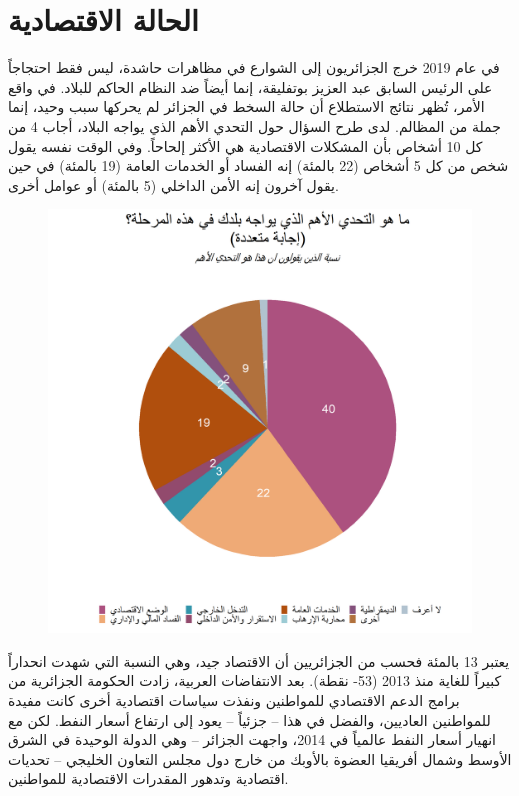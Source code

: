 \documentclass{article}
\begin{document}
\section*{الحالة الاقتصادية}

 في عام 2019 خرج الجزائريون إلى الشوارع في مظاهرات حاشدة، ليس فقط احتجاجاً على الرئيس السابق عبد العزيز بوتفليقة، إنما أيضاً ضد النظام الحاكم للبلاد. في واقع الأمر، تُظهر نتائج الاستطلاع أن حالة السخط في الجزائر لم يحركها سبب وحيد، إنما جملة من المظالم. لدى طرح السؤال حول التحدي الأهم الذي يواجه البلاد، أجاب 4 من كل 10 أشخاص بأن المشكلات الاقتصادية هي الأكثر إلحاحاً. وفي الوقت نفسه يقول شخص من كل 5 أشخاص (22 بالمئة) إنه الفساد أو الخدمات العامة (19 بالمئة) في حين يقول آخرون إنه الأمن الداخلي (5 بالمئة) أو عوامل أخرى. 
	
	\begin{center}
	\begin{figure}[H]
		\centering
		\includegraphics[width=13cm]{Q206.png}
	\end{figure}
	\end{center}

 يعتبر 13 بالمئة فحسب من الجزائريين أن الاقتصاد جيد، وهي النسبة التي شهدت انحداراً كبيراً للغاية منذ 2013 (53- نقطة). بعد الانتفاضات العربية، زادت الحكومة الجزائرية من برامج الدعم الاقتصادي للمواطنين ونفذت سياسات اقتصادية أخرى كانت مفيدة للمواطنين العاديين، والفضل في هذا – جزئياً – يعود إلى ارتفاع أسعار النفط. لكن مع انهيار أسعار النفط عالمياً في 2014، واجهت الجزائر – وهي الدولة الوحيدة في الشرق الأوسط وشمال أفريقيا العضوة بالأوبك من خارج دول مجلس التعاون الخليجي – تحديات اقتصادية وتدهور المقدرات الاقتصادية للمواطنين.
	
\end{document}
